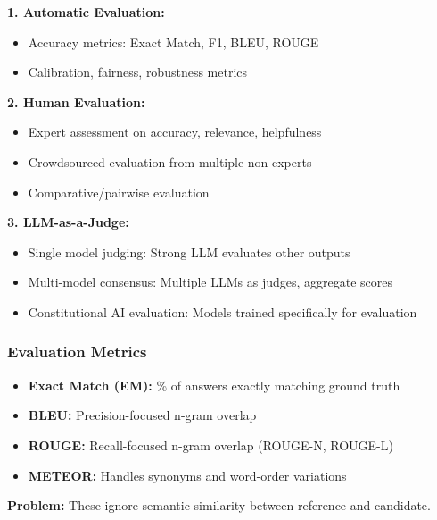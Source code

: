 \begin{thmbox}
\textbf{1. Automatic Evaluation:}
\begin{itemize}
  \item Accuracy metrics: Exact Match, F1, BLEU, ROUGE
  \item Calibration, fairness, robustness metrics
\end{itemize}

\textbf{2. Human Evaluation:}
\begin{itemize}
  \item Expert assessment on accuracy, relevance, helpfulness
  \item Crowdsourced evaluation from multiple non-experts
  \item Comparative/pairwise evaluation
\end{itemize}

\textbf{3. LLM-as-a-Judge:}
\begin{itemize}
  \item Single model judging: Strong LLM evaluates other outputs
  \item Multi-model consensus: Multiple LLMs as judges, aggregate scores
  \item Constitutional AI evaluation: Models trained specifically for evaluation
\end{itemize}
\end{thmbox}

\bigseparator

\subsubsection{Evaluation Metrics}

\begin{defbox}
\begin{itemize}
  \item \textbf{Exact Match (EM):} \% of answers exactly matching ground truth
  \item \textbf{BLEU:} Precision-focused n-gram overlap
  \item \textbf{ROUGE:} Recall-focused n-gram overlap (ROUGE-N, ROUGE-L)
  \item \textbf{METEOR:} Handles synonyms and word-order variations
\end{itemize}

\textbf{Problem:} These ignore semantic similarity between reference and candidate.
\end{defbox}


